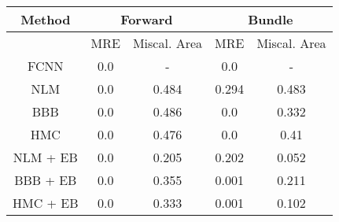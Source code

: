 \documentclass[convert={outext=.png}]{standalone}
\begin{document}
\begin{tabular}{c c c c c}
\hline
\hline
Method &  \multicolumn{2}{c}{Forward} & \multicolumn{2}{c}{Bundle} \\ \hline
 & MRE & Miscal. Area & MRE & Miscal. Area \\
 FCNN & 0.0 & - & 0.0 & - \\
 \hline
 NLM & 0.0 & 0.484 & 0.294 & 0.483 \\
 BBB & 0.0 & 0.486 & 0.0 & 0.332 \\
 HMC & 0.0 & 0.476 & 0.0 & 0.41 \\
 \hline
 NLM + EB & 0.0 & 0.205 & 0.202 & 0.052 \\
 BBB + EB & 0.0 & 0.355 & 0.001 & 0.211 \\
 HMC + EB & 0.0 & 0.333 & 0.001 & 0.102 \\
\hline
\hline
\end{tabular}
\end{document}
